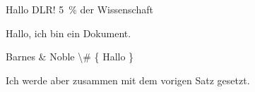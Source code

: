 \documentclass{article}
\begin{document}
Hallo DLR! 5~\% der Wissenschaft

Hallo, ich bin ein Dokument.

Barnes \& Noble \textbackslash  \textunderscore \# \{ Hallo \}

Ich werde aber zusammen mit dem vorigen Satz gesetzt.
\end{document}
